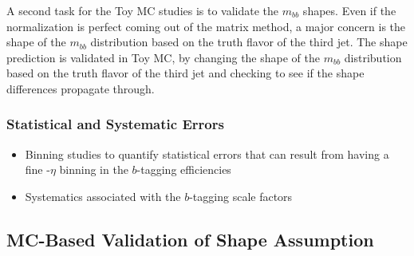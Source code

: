 A second task for the Toy MC studies is to validate the $m_{bb}$ shapes.  Even if the normalization is perfect coming out of the matrix method, a major concern is the shape of the $m_{bb}$ distribution based on the truth flavor of the third jet.  The shape prediction is validated in Toy MC, by changing the shape of the $m_{bb}$ distribution based on the truth flavor of the third jet and checking to see if the shape differences propagate through.  



\subsubsection{Statistical and Systematic Errors}
\begin{itemize}
    \item Binning studies to quantify statistical errors that can result from having a fine \pt-$\eta$ binning in the $b$-tagging efficiencies
    \item Systematics associated with the $b$-tagging scale factors
\end{itemize}



\subsection{MC-Based Validation of Shape Assumption}


















%
%


